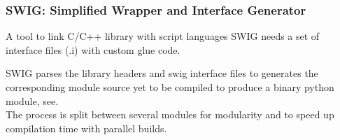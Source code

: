 \documentclass[8pt]{beamer}
\begin{document}
\begin{frame}
  \frametitle{SWIG: Simplified Wrapper and Interface Generator}
  \begin{block}{A tool to link C/C++ library with script languages}
  SWIG needs a set of interface files (.i) with custom glue code.
  
    SWIG parses the library headers and swig interface files to
  generates the corresponding module source yet to be compiled to
  produce a binary python module, see.\\
  The process is split between several modules for modularity and to speed up compilation
  time with parallel builds.
  \end{block}
  \centering {}
\end{frame}

  
  
\end{document}
